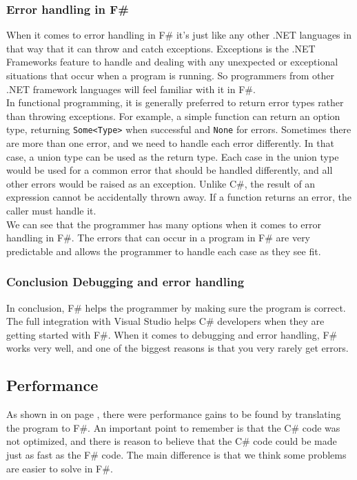 \documentclass[12pt, a4paper]{article}
\newcommand{\code}[1]{{\small \texttt{#1}}}
\begin{document}
\newpage

\subsubsection{Error handling in F\#}
When it comes to error handling in F\# it's just like any other .NET languages in that way that it can throw and catch exceptions. Exceptions is the .NET Frameworks feature to handle and dealing with any unexpected or exceptional situations that occur when a program is running. So programmers from other .NET framework languages will feel familiar with it in F\#.\\

In functional programming, it is generally preferred to return error types rather than throwing exceptions. For example, a simple function can return an option type, returning \code{Some<Type>} when successful and \code{None} for errors. Sometimes there are more than one error, and we need to handle each error differently. In that case, a union type can be used as the return type. Each case in the union type would be used for a common error that should be handled differently, and all other errors would be raised as an exception. Unlike C\#, the result of an expression cannot be accidentally thrown away. If a function returns an error, the caller must handle it.\\

We can see that the programmer has many options when it comes to error handling in F\#. The errors that can occur in a program in F\# are very predictable and allows the programmer to handle each case as they see fit.

\subsubsection{Conclusion Debugging and error handling}
In conclusion, F\# helps the programmer by making sure the program is correct. The full integration with Visual Studio helps C\# developers when they are getting started with F\#. When it comes to debugging and error handling, F\# works very well, and one of the biggest reasons is that you very rarely get errors.

\newpage

\subsection{Performance}
\label{AnalysisPerformance}
As shown in  on page \pageref{sTranslatePerformance}, there were performance gains to be found by translating the program to F\#. An important point to remember is that the C\# code was not optimized, and there is reason to believe that the C\# code could be made just as fast as the F\# code. The main difference is that we think some problems are easier to solve in F\#.
\end{document}
